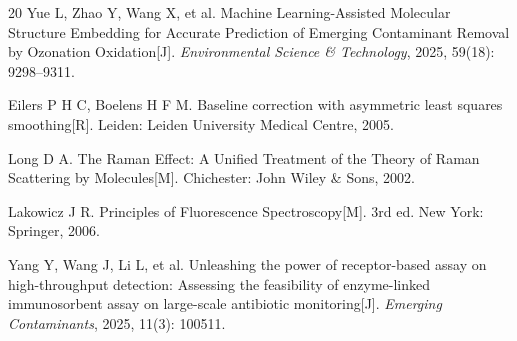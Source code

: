 \documentclass[12pt,a4paper]{article}
\begin{document}
\begin{thebibliography}{20}
 Yue L, Zhao Y, Wang X, et al. Machine Learning-Assisted Molecular Structure Embedding for Accurate Prediction of Emerging Contaminant Removal by Ozonation Oxidation[J]. \textit{Environmental Science \& Technology}, 2025, 59(18): 9298--9311.

 Eilers P H C, Boelens H F M. Baseline correction with asymmetric least squares smoothing[R]. Leiden: Leiden University Medical Centre, 2005.

 Long D A. The Raman Effect: A Unified Treatment of the Theory of Raman Scattering by Molecules[M]. Chichester: John Wiley \& Sons, 2002.

 Lakowicz J R. Principles of Fluorescence Spectroscopy[M]. 3rd ed. New York: Springer, 2006.

 Yang Y, Wang J, Li L, et al. Unleashing the power of receptor-based assay on high-throughput detection: Assessing the feasibility of enzyme-linked immunosorbent assay on large-scale antibiotic monitoring[J]. \textit{Emerging Contaminants}, 2025, 11(3): 100511.

\end{thebibliography}
\end{document}

